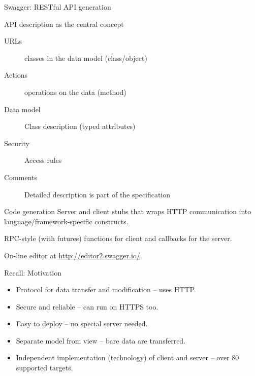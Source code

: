 \begin{frame}{Swagger: RESTful API generation}
    \begin{block}{API description as the central concept}
        \begin{description}
            \item[URLs] classes in the data model (class/object)
            \item[Actions] operations on the data (method)
            \item[Data model] Class description (typed attributes)
            \item[Security] Access rules
            \item[Comments] Detailed description is part of the specification
        \end{description}
    \end{block}
    
    \begin{block}{Code generation}
        Server and client stubs that wraps HTTP communication into
        language/framework-specific constructs.
        
        \medskip
        
        RPC-style (with futures) functions for client and
        callbacks for the server.
        
        \medskip
        
        On-line editor at \url{http://editor2.swagger.io/}.
    \end{block}
\end{frame}


\begin{frame}{Recall: Motivation}
    \begin{itemize}
        \item Protocol for data transfer and modification -- uses HTTP.
        \item Secure and reliable -- can run on HTTPS too.
        \item Easy to deploy -- no special server needed.
        \item Separate model from view -- bare data are transferred.
        \item Independent implementation (technology)
            of client and server -- over 80 supported targets.
    \end{itemize}
\end{frame}


